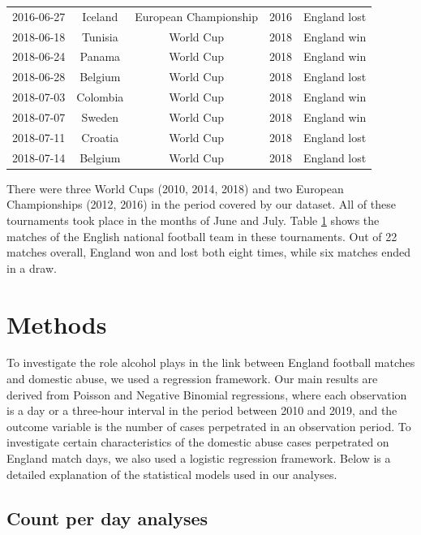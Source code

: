 \documentclass[12pt, a4paper]{article}
\begin{document}
\begin{table}[!htbp]
\begin{tabular}{ccccc}
  2016-06-27 & Iceland & European Championship & 2016 & England lost \\ 
  2018-06-18 & Tunisia & World Cup & 2018 & England win \\ 
  2018-06-24 & Panama & World Cup & 2018 & England win \\ 
  2018-06-28 & Belgium & World Cup & 2018 & England lost \\ 
  2018-07-03 & Colombia & World Cup & 2018 & England win \\ 
  2018-07-07 & Sweden & World Cup & 2018 & England win \\ 
  2018-07-11 & Croatia & World Cup & 2018 & England lost \\ 
  2018-07-14 & Belgium & World Cup & 2018 & England lost \\ 
   \hline
\end{tabular}
  \label{Tab:matches}
\end{table}

 There were three World Cups (2010, 2014, 2018) and two European Championships (2012, 2016) in the period covered by our dataset. All of these tournaments took place in the months of June and July. 
Table \ref{Tab:matches} shows the matches of the English national football team in these tournaments. Out of 22 matches overall, England won and lost both eight times, while six matches ended in a draw. 

\section{Methods}

To investigate the role alcohol plays in the link between England football matches and domestic abuse, we used a regression framework. Our main results are derived from Poisson and Negative Binomial regressions, where each observation is a day or a three-hour interval in the period between 2010 and 2019, and the outcome variable is the number of cases perpetrated in an observation period. To investigate certain characteristics of the domestic abuse cases perpetrated on England match days, we also used a logistic regression framework. Below is a detailed explanation of the statistical models used in our analyses.  


\subsection{Count per day analyses} 
\label{modelsexplained}
\end{document}
